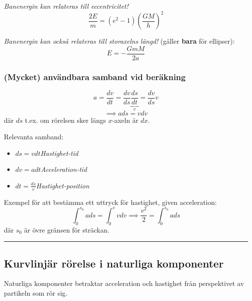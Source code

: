 \documentclass{article}
\newenvironment{ankiflashcard}[1]{}{}
\newcommand{\ruler}{
\rule{0.5\textwidth}{0.5pt}
}
\begin{document}
\begin{paracol}{2}
\begin{ankiflashcard}{Formulera formeln för banenergi kopplat till eccentricitet.}
\textit{Banenergin kan relateras till eccentricitet!}
$$\frac{2E}{m}=(e^2-1)\left( \frac{GM}{h}\right)^2$$
\end{ankiflashcard}

\begin{ankiflashcard}{Relatera banenergi till storaxelns längd.}
    
\textit{Banenergin kan också relateras till storaxelns längd!} (gäller \textbf{bara} för ellipser):
$$
E = -\frac{GmM}{2a}
$$
\end{ankiflashcard}

\switchcolumn

\begin{ankiflashcard}{Formulera en integral för att bestämma ett uttryck för hastighet utifrån acceleration.}
\subsubsection{(Mycket) användbara samband vid beräkning}
$$
a=\frac{dv}{dt}=\frac{dv}{ds}\underbrace{\frac{ds}{dt}}_{v} = \frac{dv}{ds}v
$$
$$
\implies \boxed{a ds = v dv}
$$
där $ds$ t.ex. om rörelsen sker längs $x$-axeln är $dx$.
\end{ankiflashcard}
    
\begin{ankiflashcard}{Ange Hastighet-tid, Acceleration-tid och Hastighet-position samband.}
Relevanta samband:
\begin{itemize}
    \item $ds = vdt$\quad\textit{Hastighet-tid}
    \item $dv=a dt$\quad\textit{Acceleration-tid}
    \item $dt=\frac{ds}{v}$\quad\textit{Hastighet-position}
\end{itemize}
Exempel för att bestämma ett uttryck för hastighet, given acceleration:
$$\int_0^{s_0} a ds = \int_0^v v dv\implies \frac{v^2}{2} = \int_0^{s_0} a ds$$
där $s_0$ är övre gränsen för sträckan.
\end{ankiflashcard}

\ruler
\subsection{Kurvlinjär rörelse i naturliga komponenter}
Naturliga komponenter betraktar acceleration och hastighet från perspektivet av partikeln som rör sig.


\end{paracol}
\end{document}
